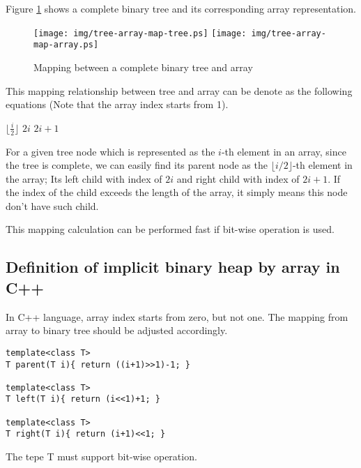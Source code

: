 \documentclass{article}
\begin{document}
Figure \ref{fig:tree-array-map} shows a complete binary tree and
its corresponding array representation.

\begin{figure}[htbp]
       \begin{center}
       	  \texttt{[image: img/tree-array-map-tree.ps]}
          \texttt{[image: img/tree-array-map-array.ps]}
        \caption{Mapping between a complete binary tree and array} \label{fig:tree-array-map}
       \end{center}
\end{figure}

This mapping relationship between tree and array can be denote as 
the following equations (Note that the array index starts from 1).

\begin{algorithmic}[1]
  \State \Return $\lfloor \frac{i}{2} \rfloor$
\EndFunction
\Statex
{}
  \State \Return $2i$
\EndFunction
\Statex
{}
  \State \Return $2i+1$
\EndFunction
\end{algorithmic}

For a given tree node which is represented as the $i$-th element in an
array, since the tree is complete, we can easily find its parent node
as the $\lfloor i/2 \rfloor$-th element in the array; Its left child
with index of $2i$ and right child with index of $2i+1$. If the index
of the child exceeds the length of the array, it simply means this 
node don't have such child.

This mapping calculation can be performed fast if bit-wise operation
is used.

\subsection*{Definition of implicit binary heap by array in C++}
In C++ language, array index starts from zero, but not one. The mapping
from array to binary tree should be adjusted accordingly.

\lstset{language=C++}
\begin{lstlisting}
template<class T>
T parent(T i){ return ((i+1)>>1)-1; }

template<class T>
T left(T i){ return (i<<1)+1; }

template<class T>
T right(T i){ return (i+1)<<1; }
\end{lstlisting}

The tepe T must support bit-wise operation.
\end{document}
